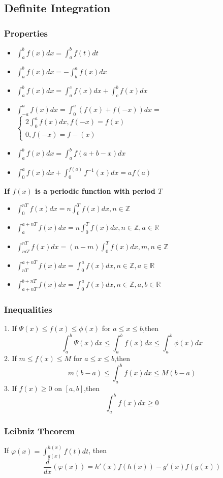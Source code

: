 \documentclass[twocolumn, 10pt]{article}
\begin{document}
\subsection{Definite Integration}
\subsubsection{Properties}
\begin{itemize}
\item $\int_{a}^{b}f(x)dx=\int_{a}^{b}f(t)dt$
\item $\int_{a}^{b}f(x)dx=-\int_{b}^{a}f(x)dx$
\item $\int_{a}^{b}f(x)dx=\int_{a}^{c}f(x)dx+\int_{c}^{b}f(x)dx$
\item $\int_{-a}^{a}f(x)dx=\int_{0}^{a}(f(x)+f(-x))dx=$ $\begin{cases}
  2\int_{0}^{a}f(x)dx,f(-x)=f(x)\\
  0,f(-x)=f-(x)
\end{cases}$
\item $\int_{a}^{b}f(x)dx=\int_{a}^{b}f(a+b-x)dx$
\item $\int_{0}^{a}f(x)dx + \int_{0}^{f(a)}f^{-1}(x)dx = af(a)$
\end{itemize}

\textbf{If $f(x)$ is a periodic function with period $T$}
\begin{itemize}
\item $\int_{0}^{nT}f(x)dx=n\int_{0}^{T}f(x)dx,n \in \mathbb{Z}$
\item $\int_{a}^{a+nT}f(x)dx=n\int_{0}^{T}f(x)dx, n \in \mathbb{Z},a \in \mathbb{R}$
\item $\int_{mT}^{nT}f(x)dx=(n-m)\int_{0}^{T}f(x)dx, m,n \in \mathbb{Z}$
\item $\int_{nT}^{a+nT}f(x)dx=\int_{0}^{a}f(x)dx, n \in \mathbb{Z}, a \in \mathbb{R}$
\item $\int_{a+nT}^{b+nT}f(x)dx=\int_{0}^{a}f(x)dx,n \in \mathbb{Z}, a,b \in \mathbb{R}$
\end{itemize}
\subsubsection{Inequalities}
1. If $\Psi(x) \le f(x) \le \phi(x)$  for $a \le x \le b$,then
$$\int_{a}^{b}\Psi(x)dx \le \int_{a}^{b}f(x)dx \le \int_{a}^{b}\phi(x)dx$$
2. If $m \le f(x) \le M$ for $a \le x \le b$,then 
$$m(b-a) \le \int_{a}^{b}f(x)dx \le M(b-a)$$
3. If $f(x) \ge 0$ on $[a,b]$,then $$\int_{a}^{b}f(x)dx \ge 0$$
\subsubsection{Leibniz Theorem} 
If $\varphi(x)=\int_{g(x)}^{h(x)}f(t)dt$, then
$$\frac{d}{dx}(\varphi(x))=h'(x)f(h(x))-g'(x)f(g(x))$$
\end{document}
